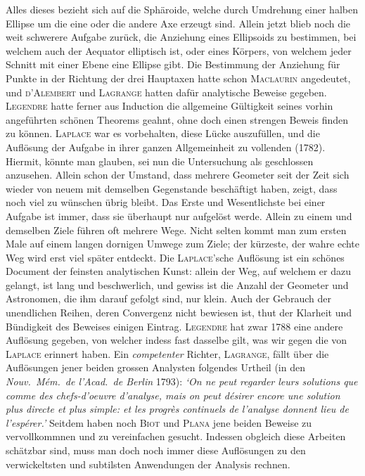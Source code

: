 \documentclass[11pt,a4paper]{article}
\begin{document}
Alles dieses bezieht sich auf die Sphäroide, welche durch Umdrehung einer halben Ellipse um die eine oder die andere Axe erzeugt sind. Allein jetzt blieb noch die weit schwerere Aufgabe zurück, die Anziehung eines Ellipsoids zu bestimmen, bei welchem auch der Aequator elliptisch ist, oder eines Körpers, von welchem jeder Schnitt mit einer Ebene eine Ellipse gibt. Die Bestimmung der Anziehung für Punkte in der Richtung der drei Hauptaxen hatte schon \textsc{Maclaurin} angedeutet, und \textsc{d'Alembert} und \textsc{Lagrange} hatten dafür analytische Beweise gegeben. \textsc{Legendre} hatte ferner aus Induction die allgemeine Gültigkeit seines vorhin angeführten schönen Theorems geahnt, ohne doch einen strengen Beweis finden zu können. \textsc{Laplace} war es vorbehalten, diese Lücke auszufüllen, und die Auflösung der Aufgabe in ihrer ganzen Allgemeinheit zu vollenden (1782). Hiermit, könnte man glauben, sei nun die Untersuchung als geschlossen anzusehen. Allein schon der Umstand, dass mehrere Geometer seit der Zeit sich wieder von neuem mit demselben Gegenstande beschäftigt haben, zeigt, dass noch viel zu wünschen übrig bleibt. Das Erste und Wesentlichste bei einer Aufgabe ist immer, dass sie überhaupt nur aufgelöst werde. Allein zu einem und demselben Ziele führen oft mehrere Wege. Nicht selten kommt man zum ersten Male auf einem langen dornigen Umwege zum Ziele; der kürzeste, der wahre echte Weg wird erst viel später entdeckt. Die \textsc{Laplace}'sche Auflösung ist ein schönes Document der feinsten analytischen Kunst: allein der Weg, auf welchem er dazu gelangt, ist lang und beschwerlich, und gewiss ist die Anzahl der Geometer und Astronomen, die ihm darauf gefolgt sind, nur klein. Auch der Gebrauch der unendlichen Reihen, deren Convergenz nicht bewiesen ist, thut der Klarheit und Bündigkeit des Beweises einigen Eintrag. \textsc{Legendre} hat zwar 1788 eine andere Auflösung gegeben, von welcher indess fast dasselbe gilt, was wir gegen die von \textsc{Laplace} erinnert haben. Ein \textit{competenter} Richter, \textsc{Lagrange}, fällt über die Auflösungen jener beiden grossen Analysten folgendes Urtheil (in den \textit{Nouv.\ Mém.\ de l'Acad.\ de Berlin} 1793): \textit{`On ne peut regarder leurs solutions que comme des chefs-d'oeuvre d'analyse, mais on peut désirer encore une solution plus directe et plus simple: et les progrès continuels de l'analyse donnent lieu de l'espérer.'} Seitdem haben noch \textsc{Biot} und \textsc{Plana} jene beiden Beweise zu vervollkommnen und zu vereinfachen gesucht. Indessen obgleich diese Arbeiten schätzbar sind, muss man doch noch immer diese Auflösungen zu den verwickeltsten und subtilsten Anwendungen der Analysis rechnen.
\end{document}
